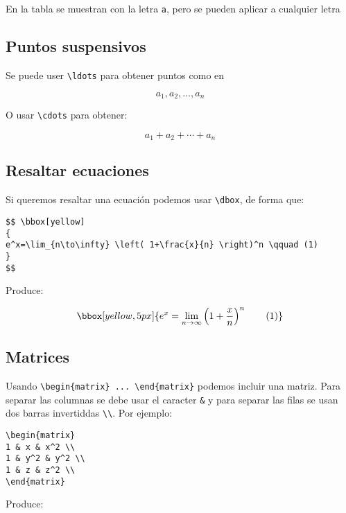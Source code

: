 \documentclass[11pt]{article}
\begin{document}
En la tabla se muestran con la letra \texttt{a}, pero se pueden aplicar
a cualquier letra

    \subsection{Puntos suspensivos}\label{puntos-suspensivos}

Se puede user \texttt{\textbackslash{}ldots} para obtener puntos como en

\[ a_1, a_2, \ldots, a_n \]

O usar \texttt{\textbackslash{}cdots} para obtener:

\[ a_1+a_2+\cdots+a_n \]

    \subsection{Resaltar ecuaciones}\label{resaltar-ecuaciones}

Si queremos resaltar una ecuación podemos usar
\texttt{\textbackslash{}dbox}, de forma que:

\begin{verbatim}
$$ \bbox[yellow]
{
e^x=\lim_{n\to\infty} \left( 1+\frac{x}{n} \right)^n \qquad (1)
}
$$
\end{verbatim}

Produce:

\[ \bbox[yellow,5px]
{
e^x=\lim_{n\to\infty} \left( 1+\frac{x}{n} \right)^n \qquad (1)
}
\]

    \subsection{Matrices}\label{matrices}

Usando
\texttt{\textbackslash{}begin\{matrix\}\ ...\ \textbackslash{}end\{matrix\}}
podemos incluir una matriz. Para separar las columnas se debe usar el
caracter \texttt{\&} y para separar las filas se usan dos barras
invertiddas \texttt{\textbackslash{}\textbackslash{}}. Por ejemplo:

\begin{verbatim}
\begin{matrix}
1 & x & x^2 \\
1 & y^2 & y^2 \\
1 & z & z^2 \\
\end{matrix}
\end{verbatim}

Produce:
\end{document}
